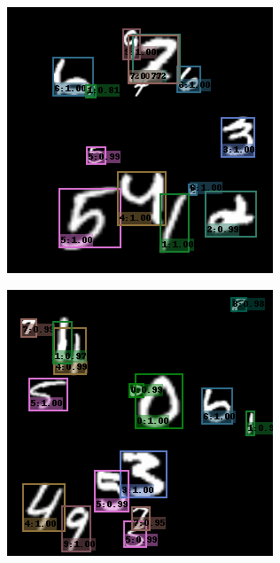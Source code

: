 \begin{figure}
  \centering
  \begin{subfigure}[b]{0.49\textwidth}
    \centering
    \includegraphics[width=\textwidth]{figures/12.png}
  \end{subfigure}
  \begin{subfigure}[b]{0.49\textwidth}
    \centering
    \includegraphics[width=\textwidth]{figures/13.png}

\end{subfigure}
\end{figure}
